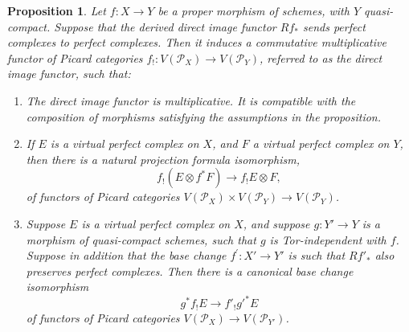 \documentclass[JEP,XML,SOM,Unicode,published]{cedram}
\theoremstyle{plain}
\newtheorem{proposition}[theorem]{Proposition}
\theoremstyle{definition}
\newcommand{\Pcal}{\mathcal P}
\begin{document}
\begin{proposition}\label{prop:properties-direct-image-virtual}
Let $f: X\to Y$ be a proper morphism of schemes, with $Y$ quasi-compact. Suppose that the derived direct image functor $Rf_\ast$ sends perfect complexes to perfect complexes. Then it induces a commutative multiplicative functor of Picard categories $f_!: V(\Pcal_X) \to V(\Pcal_Y)$, referred to as the direct image functor, such that:
\begin{enumerate}
\item\label{item:properties-direct-image-virtual-1} The direct image functor is multiplicative. It is compatible with the composition of morphisms satisfying the assumptions in the proposition.
\item\label{item:properties-direct-image-virtual-2} If $E$ is a virtual perfect complex on $X$, and $F$ a virtual perfect complex on $Y$, then there is a natural projection formula isomorphism,
\begin{displaymath}
f_! \left(E \otimes f^\ast F\right)\to f_! E \otimes F,
\end{displaymath}
of functors of Picard categories $V(\Pcal_X) \times V(\Pcal_Y) \to V(\Pcal_Y)$.
\item\label{item:properties-direct-image-virtual-3} Suppose $E$ is a virtual perfect complex on $X$, and suppose $g \colon Y' \to Y$ is a morphism of quasi-compact schemes, such that $g$ is Tor-independent with $f$. Suppose in addition that the base change $f^\prime \colon X' \to Y'$ is such that $R{f'}_\ast$ also preserves perfect complexes. Then there is a canonical base change isomorphism
\begin{displaymath}
g^\ast f_! E \to f'_! {g'}^\ast E
\end{displaymath}
of functors of Picard categories $V(\Pcal_X) \to V(\Pcal_{Y'})$.
\end{enumerate}
\end{proposition}
\end{document}
